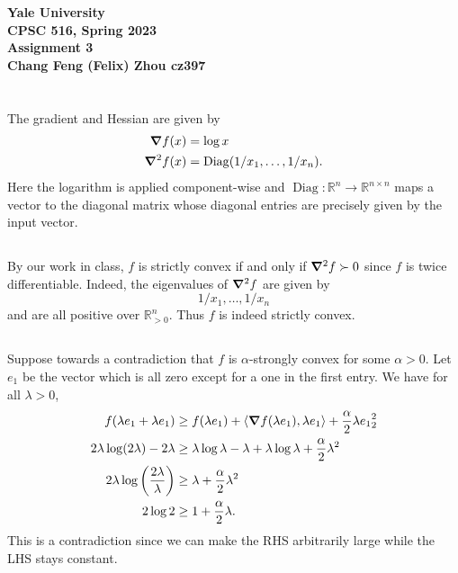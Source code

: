 \documentclass[10pt]{article}
\DeclarePairedDelimiter{\iprod}{\langle}{\rangle}
\let\norm\relax
\DeclarePairedDelimiter{\norm}{\lVert}{\rVert}
\DeclareMathOperator{\Diag}{Diag}
\newcommand{\R}{\mathbb{R}}
\begin{document}
\begin{center}
    {\Large\textbf{Yale University}}\\
    \vspace{3mm}
    {\Large\textbf{CPSC 516, Spring 2023}}\\
    \vspace{2mm}
    {\Large\textbf{Assignment 3}}\\
    \vspace{3mm}
    \textbf{Chang Feng (Felix) Zhou cz397}
\end{center}

\section{}
\subsection{}
The gradient and Hessian are given by
\begin{align*}
  \grad f(x)
  &= \log x \\
  \grad^2 f(x)
  &= \Diag(1/x_1, \dots, 1/x_n).
\end{align*}
Here the logarithm is applied component-wise
and $\Diag: \R^n\to \R^{n\times n}$ maps a vector
to the diagonal matrix whose diagonal entries are precisely given by the input vector.

\subsection{}
By our work in class,
$f$ is strictly convex if and only if $\grad^2 f\succ 0$
since $f$ is twice differentiable.
Indeed,
the eigenvalues of $\grad^2 f$ are given by
\[
  1/x_1, \dots, 1/x_n
\]
and are all positive over $\R_{>0}^n$.
Thus $f$ is indeed strictly convex.

\subsection{}
Suppose towards a contradiction that $f$ is $\alpha$-strongly convex for some $\alpha > 0$.
Let $e_1$ be the vector which is all zero except for a one in the first entry.
We have for all $\lambda > 0$,
\begin{align*}
  f(\lambda e_1 + \lambda e_1) &\geq f(\lambda e_1) + \iprod{\grad f(\lambda e_1), \lambda e_1} + \frac\alpha2 \norm{\lambda e_1}_2^2 \\
  2\lambda \log(2\lambda) - 2\lambda &\geq \lambda \log \lambda - \lambda + \lambda \log \lambda + \frac\alpha2 \lambda^2 \\
  2\lambda \log\left( \frac{2\lambda}\lambda \right) &\geq \lambda + \frac\alpha2 \lambda^2 \\
  2\log2 &\geq 1 + \frac\alpha2 \lambda.
\end{align*}
This is a contradiction since we can make the RHS arbitrarily large
while the LHS stays constant.
\end{document}
